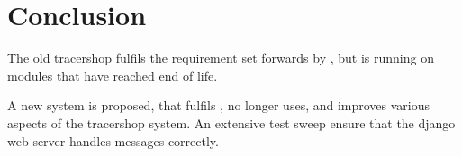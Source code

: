 \documentclass{article}
\begin{document}
\section*{Conclusion}
The old tracershop fulfils the requirement set forwards by , but is running on modules that have reached end of life.

A new system is proposed, that fulfils , no longer uses, and improves various aspects of the tracershop system.
An extensive test sweep ensure that the django web server handles messages correctly.






\clearpage

\printglossaries
\end{document}
